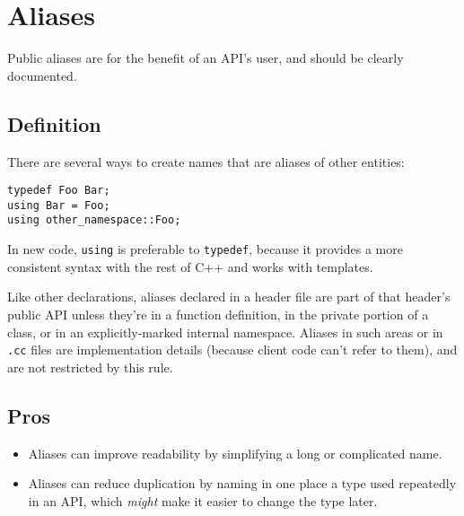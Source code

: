 
\section{Aliases}\label{sec:aliases}
Public aliases are for the benefit of an API's user, and should be clearly documented.

\subsection{Definition}
There are several ways to create names that are aliases of other entities:
\begin{verbatim}
typedef Foo Bar;
using Bar = Foo;
using other_namespace::Foo;
\end{verbatim}
In new code, \texttt{using} is preferable to \texttt{typedef}, because it provides a more consistent syntax with the rest of C++ and works with templates.

Like other declarations, aliases declared in a header file are part of that header's public API unless they're in a function definition, in the private portion of a class, or in an explicitly-marked internal namespace. Aliases in such areas or in \texttt{.cc} files are implementation details (because client code can't refer to them), and are not restricted by this rule.

\subsection{Pros}
\begin{itemize}
\item Aliases can improve readability by simplifying a long or complicated name.
\item Aliases can reduce duplication by naming in one place a type used repeatedly in an API, which \emph{might} make it easier to change the type later.
\end{itemize}
